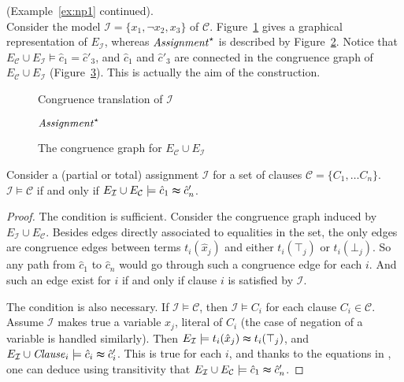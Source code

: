 \documentclass[a4paper,11pt]{article}
\begin{document}
\begin{example}\label{ex:np2} (Example~\ref{ex:np1} continued).\\
Consider the model $\mathcal{I} = \{x_1, \neg x_2, x_3\}$ of $\mathcal{C}$.
Figure~\ref{fig:npassignment} gives a graphical representation of
$E_{\mathcal{I}}$, whereas ${\it Assignment}^\star$ is described by
Figure~\ref{fig:npassignmentstar}.  Notice that
$E_{\mathcal{C}} \cup E_{\mathcal{I}} \models \hat{c}_1 = \hat{c}'_3$,
and $\hat{c}_1$ and $\hat{c}'_3$ are connected in the congruence graph
of $E_{\mathcal{C}} \cup E_{\mathcal{I}}$ (Figure~\ref{fig:npmodel}).
This is actually the aim of the construction.

\begin{figure}[ht]

\caption{Congruence translation of $\mathcal{I}$}
\label{fig:npassignment}
\end{figure}

\begin{figure}[ht]

\caption{${\it Assignment}^\star$}
\label{fig:npassignmentstar}
\end{figure}
\begin{figure}[ht]

\caption{The congruence graph for $E_{\mathcal{C}} \cup E_{\mathcal{I}}$}
\label{fig:npmodel}
\end{figure}
\end{example}

\begin{lemma}
\label{lemma:eqv}
Consider a (partial or total) assignment $\mathcal{I}$ for a set of clauses
$\mathcal{C}= \{C_1, \dots C_n\}$.  $\mathcal{I} \models \mathcal{C}$ if and only if
$E_{\mathcal{I}} \cup E_\mathcal{C} \models \hat{c}_1 \thickapprox \hat{c}'_n$.
\end{lemma}
\begin{proof}
The condition is sufficient.  Consider the congruence graph induced by
$E_{\mathcal{I}} \cup E_\mathcal{C}$.  Besides edges directly associated to
equalities in the set, the only edges are congruence edges between terms
$t_i(\hat{x}_j)$ and either $t_i(\top_j)$ or $t_i(\bot_j)$.  So any path from
$\hat{c}_1$ to $\hat{c}_n$ would go through such a congruence edge for each $i$.
And such an edge exist for $i$ if and only if clause $i$ is satisfied by
$\mathcal{I}$.

The condition is also necessary.  If $\mathcal{I} \models \mathcal{C}$, then
$\mathcal{I} \models C_i$ for each clause $C_i \in \mathcal{C}$.  Assume
$\mathcal{I}$ makes true a variable $x_j$, literal of $C_i$ (the case of
negation of a variable is handled similarly).  Then $E_{\mathcal{I}} \models
t_i(\hat{x}_j) \thickapprox t_i(\top_j)$, and $E_{\mathcal{I}} \cup {\it Clause}_i
\models \hat{c}_i \thickapprox \hat{c}_i'$.  This is true for each $i$, and
thanks to the equations in \Connect, one can deduce using transitivity that
$E_{\mathcal{I}} \cup E_\mathcal{C} \models \hat{c}_1 \thickapprox \hat{c}_n'$.
\end{proof}
\end{document}
